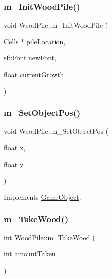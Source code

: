 \subsubsection{\texorpdfstring{m\+\_\+\+Init\+Wood\+Pile()}{m\_InitWoodPile()}}
{\footnotesize\ttfamily void Wood\+Pile\+::m\+\_\+\+Init\+Wood\+Pile (\begin{DoxyParamCaption}\item[{\mbox{\hyperlink{class_cells}{Cells}} $\ast$}]{pile\+Location,  }\item[{sf\+::\+Font}]{new\+Font,  }\item[{float}]{current\+Growth }\end{DoxyParamCaption})}

\mbox{\label{class_wood_pile_a8faa580584607dea772076b7d856daf8}} 
\subsubsection{\texorpdfstring{m\+\_\+\+Set\+Object\+Pos()}{m\_SetObjectPos()}}
{\footnotesize\ttfamily void Wood\+Pile\+::m\+\_\+\+Set\+Object\+Pos (\begin{DoxyParamCaption}\item[{float}]{x,  }\item[{float}]{y }\end{DoxyParamCaption})\hspace{0.3cm}{\ttfamily [virtual]}}



Implements \mbox{\hyperlink{class_game_object_ad1f8ea8eb3673b1af8215bf92cdc0df8}{Game\+Object}}.

\mbox{\label{class_wood_pile_ae034c119180b63f716472739b80f9f63}} 
\subsubsection{\texorpdfstring{m\+\_\+\+Take\+Wood()}{m\_TakeWood()}}
{\footnotesize\ttfamily int Wood\+Pile\+::m\+\_\+\+Take\+Wood (\begin{DoxyParamCaption}\item[{int}]{amount\+Taken }\end{DoxyParamCaption})}


